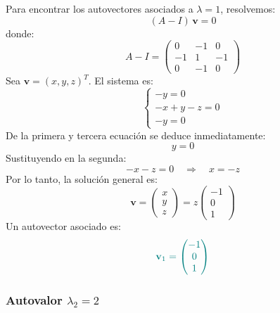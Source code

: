 \documentclass{article}
\begin{document}
\begin{enumerate}[label=\textbf{\alph*)}]
Para encontrar los autovectores asociados a \(\lambda = 1\), resolvemos:
\[
(A - I)\,\mathbf{v} = 0
\]
donde:
\[
A - I =
\begin{pmatrix}
0 & -1 & 0\\
-1 & 1 & -1\\
0 & -1 & 0
\end{pmatrix}
\]
Sea \(\mathbf{v} = (x, y, z)^T\). El sistema es:
\[
\begin{cases}
- y = 0\\[4pt]
- x + y - z = 0\\[4pt]
- y = 0
\end{cases}
\]
De la primera y tercera ecuación se deduce inmediatamente:
\[
y = 0
\]
Sustituyendo en la segunda:
\[
- x - z = 0
\quad\Longrightarrow\quad
x = -z
\]
Por lo tanto, la solución general es:
\[
\mathbf{v} =
\begin{pmatrix}
x\\
y\\
z
\end{pmatrix}
=
z\begin{pmatrix}
-1\\
0\\
1
\end{pmatrix}
\]
Un autovector asociado es:
\[
\color{teal}
\mathbf{v}_1 =
\begin{pmatrix}
-1\\
0\\
1
\end{pmatrix}
\]

\subsubsection*{Autovalor \(\lambda_2 = 2\)}


\end{enumerate}
\end{document}
